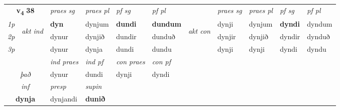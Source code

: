 \noindent
\begin{tabular}{lllllllllll} \toprule
\multicolumn{2}{c}{\textbf{v{\textsubscript{4}}} \Large{\textbf{38}}}  &  \textit{praes sg}  & \textit{praes pl}  &\textit{ pf sg} & \textit{pf pl} &  &  \textit{praes sg}  & \textit{praes pl}  & \textit{pf sg} & \textit{pf pl } \\*
	\cmidrule{3-6} \cmidrule{8-11}
 {\textit{1p}} & \multirow{3}{*}{\begin{turn}{90}\textit{akt ind}\end{turn}} & \textbf{dyn} & dynjum & \textbf{dundi} & \textbf{dundum} & \multirow{3}{*}{\begin{turn}{90}\textit{akt con}\end{turn}} &dynji & dynjum & \textbf{dyndi} & dyndum\\*
 {\textit{2p}} &  &  dynur  & dynjið & dundir & dunduð & & dynjir & dynjið & dyndir & dynduð \\*
{\textit{3p}} &  & dynur & dynja & dundi & dundu & & dynji & dynji& dyndi & dyndu \\*
\cmidrule{3-6} \cmidrule{8-11}

   & &  \textit{ind praes} & \textit{ind pf} & \textit{con praes} & \textit{con pf} \\*
\multicolumn{2}{c}{ \textit{það} } & dynur & dundi & dynji & dyndi \\*

\cmidrule{3-4}
   \multicolumn{2}{c}{\textit{inf}}     & \textit{presp} & \textit{supin}   \\*
  \multicolumn{2}{c}{\textbf{dynja}}      & dynjandi &  \textbf{dunið}   \\*
\end{tabular}

